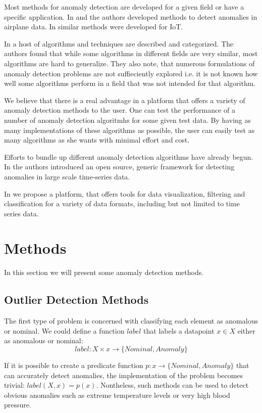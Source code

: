 \documentclass{article}
\begin{document}
Most methods for anomaly detection are developed for a given field or have a specific application. In \cite{nnfd1994} and \cite{MMAD2006} the authors developed methods to detect anomalies in airplane data. In \cite{ghad2018} similar methods were developed for IoT.

In \cite{outlierSurvey2014} a host of algorithms and techniques are described and categorized. The authors found that while some algorithms in different fields are very similar, most algorithms are hard to generalize. They also note, that numerous formulations of anomaly detection problems are not suffieciently explored i.e. it is not known how well some algorithms perform in a field that was not intended for that algorithm.

We believe that there is a real advantage in a platform that offers a variety of anomaly detection methods to the user. One can test the performance of a number of anomaly detection algoritmhs for some given test data. By having as many implementations of these algorithms as possible, the user can easily test as many algorithms as she wants with minimal effort and cost.

Efforts to bundle up different anomaly detection algorithms have already begun. In \cite{egads2015} the authors introduced an open source, generic framework for detecting anomalies in large scale time-series data.

In \cite{tpad2018} we propose a platform, that offers tools for data visualization, filtering and classification for a variety of data formats, including but not limited to time series data.

\section{Methods \label{methods}}

In this section we will present some anomaly detection methods.

\subsection{Outlier Detection Methods}

The first type of problem is concerned with classifying each element as anomalous or nominal. We could define a function $label$ that labels a datapoint $x \in X$ either as anomalous or nominal:
$$
    label: X \times x \rightarrow \{Nominal, Anomaly\}
$$

If it is possible to create a predicate function $p: x \rightarrow \{Nominal, Anomaly\}$ that can accurately detect anomalies, the implementation of the problem becomes trivial: $label(X, x) = p(x)$. Nontheless, such methods can be used to detect obvious anomalies such as extreme temperature levels or very high blood pressure.
\end{document}
